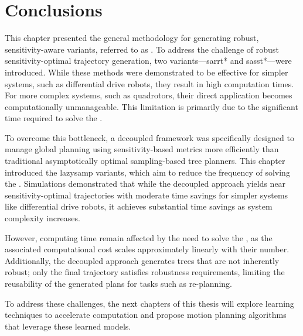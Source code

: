 \section{Conclusions}\label{sec:concl}

This chapter presented the general methodology for generating robust, sensitivity-aware variants, referred to as . 
To address the challenge of robust sensitivity-optimal trajectory generation, two variants—\gls{sarrt*} and \gls{sasst*}—were introduced. 
While these methods were demonstrated to be effective for simpler systems, such as differential drive robots, they result in high computation times. 
For more complex systems, such as quadrotors, their direct application becomes computationally unmanageable.
This limitation is primarily due to the significant time required to solve the .

To overcome this bottleneck, a decoupled framework was specifically designed to manage global planning using sensitivity-based metrics more efficiently than traditional asymptotically optimal sampling-based tree planners. 
This chapter introduced the \gls{lazysamp} variants, which aim to reduce the frequency of solving the . 
Simulations demonstrated that while the decoupled approach yields near sensitivity-optimal trajectories with moderate time savings for simpler systems like differential drive robots, it achieves substantial time savings as system complexity increases.

However, computing time remain affected by the need to solve the , as the associated computational cost scales approximately linearly with their number.
Additionally, the decoupled approach generates trees that are not inherently robust; only the final trajectory satisfies robustness requirements, limiting the reusability of the generated plans for tasks such as re-planning.

To address these challenges, the next chapters of this thesis will explore learning techniques to accelerate  computation and propose motion planning algorithms that leverage these learned models.